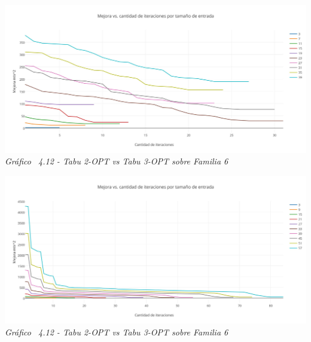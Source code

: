 \vspace*{0.3cm} \vspace*{0.3cm}
  \begin{center}
 \includegraphics[scale=0.5]{./EJ4/mejora.png}\\
 {            \textit{Gráfico \ 4.12 - Tabu 2-OPT vs Tabu 3-OPT sobre Familia 6}}
  \end{center}
  \vspace*{0.3cm}
  
  \vspace*{0.3cm} \vspace*{0.3cm}
  \begin{center}
 \includegraphics[scale=0.5]{./EJ4/mejora1.png}\\
 {            \textit{Gráfico \ 4.12 - Tabu 2-OPT vs Tabu 3-OPT sobre Familia 6}}
  \end{center}
  \vspace*{0.3cm}
  
